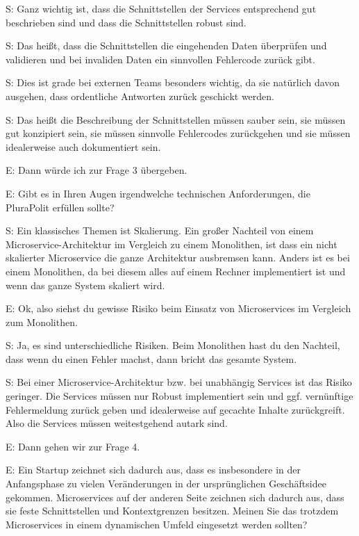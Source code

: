  \label{appendix:s-13}
S: Ganz wichtig ist, dass die Schnittstellen der Services entsprechend gut beschrieben sind und dass die Schnittstellen robust sind.

 \label{appendix:s-14}  \label{appendix:s-15}
S: Das heißt, dass die Schnittstellen die eingehenden Daten überprüfen und validieren und bei invaliden Daten ein sinnvollen Fehlercode zurück gibt.

S: Dies ist grade bei externen Teams besonders wichtig, da sie natürlich davon ausgehen, dass  ordentliche Antworten zurück geschickt werden.

S: Das heißt die Beschreibung der Schnittstellen müssen sauber sein, sie müssen gut konzipiert sein, sie müssen sinnvolle Fehlercodes zurückgehen und sie müssen idealerweise auch dokumentiert sein.

E: Dann würde ich zur Frage 3 übergeben. 

E: Gibt es in Ihren Augen irgendwelche technischen Anforderungen, die PluraPolit erfüllen sollte? 

 \label{appendix:s-16}
S: Ein klassisches Themen ist Skalierung. Ein großer Nachteil von einem Microservice-Architektur im Vergleich zu einem Monolithen, ist dass ein nicht skalierter Microservice die ganze Architektur ausbremsen kann. Anders ist es bei einem Monolithen, da bei diesem alles auf einem Rechner implementiert ist und wenn das ganze System skaliert wird.

E: Ok, also siehst du gewisse Risiko beim Einsatz von Microservices im Vergleich zum Monolithen. 

 \label{appendix:s-17}
S: Ja, es sind unterschiedliche Risiken. Beim Monolithen hast du den Nachteil, dass wenn du einen Fehler machst, dann bricht das gesamte System.

 \label{appendix:s-18}
S: Bei einer Microservice-Architektur bzw. bei unabhängig Services ist das Risiko geringer. Die Services müssen nur Robust implementiert sein und ggf. vernünftige Fehlermeldung zurück geben und idealerweise auf gecachte Inhalte zurückgreift. Also die Services müssen weitestgehend autark sind.

E: Dann gehen wir zur Frage 4.

E: Ein Startup zeichnet sich dadurch aus, dass es insbesondere in der Anfangsphase zu vielen Veränderungen in der ursprünglichen Geschäftsidee gekommen. Microservices auf der anderen Seite zeichnen sich dadurch aus, dass sie feste Schnittstellen und Kontextgrenzen besitzen. Meinen Sie das trotzdem Microservices in einem dynamischen Umfeld eingesetzt werden sollten?

